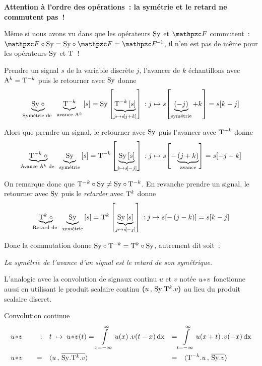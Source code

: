 \begin{remarque}
  \textbf{Attention à l'ordre des opérations~: la symétrie et le
    retard ne commutent pas~!}

  Même si nous avons vu dans  que les opérateurs
  $\mathrm{Sy}$ et $\F$ commutent~: $\F\circ\Sy=\Sy\circ\F=\Finv$, il n'en est
  pas de même pour les opérateurs $\mathrm{Sy}$ et $\mathrm{T}$~!

  Prendre un signal $s$ de la variable discrète $j$, l'avancer de $k$
  échantillons avec $\mathrm{A}^k=\mathrm{T}^{-k}$ puis le retourner avec
  $\mathrm{Sy}$ donne
  $$\underbrace{\mathrm{Sy}\;\circ}_{\text{Symétrie de }}\;\underbrace{\mathrm{T}^{-k}}_{\text{avance }\mathrm{A}^k}\left[s\right] = \mathrm{Sy}\left[\underbrace{\mathrm{T}^{-k}\left[s\right]}_{j\mapsto s\!\left[j+k\right]}\right]\,: j\mapsto s\!\left[\underbrace{\left(-j\right)}_{\text{symétrie}}+k\right]=s\!\left[k-j\right]$$

  Alors que prendre un signal, le retourner avec $\mathrm{Sy}$ puis l'avancer
  avec $\mathrm{T}^{-k}$ donne
  $$\underbrace{\mathrm{T}^{-k}\;\circ}_{\text{Avance }\mathrm{A}^k\text{ de }}\;\underbrace{\mathrm{Sy}}_{\text{symétrie}}\left[s\right]= \mathrm{T}^{-k}\left[\underbrace{\mathrm{Sy}\left[s\right]}_{j\mapsto s\!\left[-j\right]}\right]\,: j\mapsto s
  \!\left[-\underbrace{\left(j+k\right)}_{\text{avance}}\right]=s\!\left[-j-k\right]$$

  On remarque donc que $\mathrm{T}^{-k}\circ\mathrm{Sy}\neq\mathrm{Sy}\circ\mathrm{T}^{-k}$. En
  revanche prendre un signal, le retourner avec $\mathrm{Sy}$ puis le \emph{retarder}
  avec $\mathrm{T}^{k}$ donne
  $$\underbrace{\mathrm{T}^{k}\;\circ}_{\text{Retard de }}\;\underbrace{\mathrm{Sy}}_{\text{symétrie}}\left[s\right]= \mathrm{T}^{k}\left[\underbrace{\mathrm{Sy}\left[s\right]}_{j\mapsto s\!\left[-j\right]}\right]\,: j\mapsto s\!\left[-\left(j-k\right)\right]=s\!\left[k-j\right]$$

  Donc la commutation donne $\mathrm{Sy}\circ\mathrm{T}^{-k}=\mathrm{T}^{k}\circ\mathrm{Sy}$,
  autrement dit soit~:

\emph{  \og{} La symétrie de l'avance d'un signal est le retard de son
  symétrique\fg.}
\end{remarque}

L'analogie avec la convolution de signaux continu $u$ et $v$ notée
$u\!\ast\! v$ fonctionne aussi en utilisant le produit scalaire continu
$\langle\!\!\langle u\,,\,\mathrm{Sy}.\mathrm{T}^k.v\rangle\!\!\rangle$ au lieu du produit scalaire discret.

\begin{definition}{Convolution continue}
  \begin{align}
    \label{eq:convolution_continue}
    &u\conv v \quad &:& \quad  t \;\mapsto\; u\conv v\de{t} =\integ{x=-\infty}{\infty}{u\de{x}.v\de{t-x}\dx} &=& \integ{t=-\infty}{\infty}{u\de{x+t}.v\de{-x}\dx} \nonumber\\
    &u\conv v & = & \quad \scal{u}{\conj{\Sy.\oret^k.v}} &=& \quad\scal{\oret^{-k}.u}{\conj{\Sy.v}} 
  \end{align}
\end{definition}


